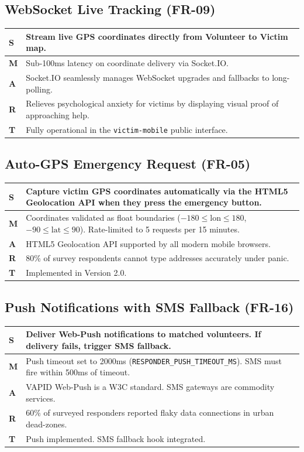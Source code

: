 \documentclass[12pt,a4paper]{article}
\begin{document}
\subsection{WebSocket Live Tracking (FR-09)}
\begin{tabularx}{\textwidth}{|l|X|}
\hline
\rowcolor{lightorange}
\textbf{S} & Stream live GPS coordinates directly from Volunteer to Victim map. \\
\hline
\textbf{M} & Sub-100ms latency on coordinate delivery via Socket.IO. \\
\hline
\textbf{A} & Socket.IO seamlessly manages WebSocket upgrades and fallbacks to long-polling. \\
\hline
\textbf{R} & Relieves psychological anxiety for victims by displaying visual proof of approaching help. \\
\hline
\textbf{T} & Fully operational in the \texttt{victim-mobile} public interface. \\
\hline
\end{tabularx}

\subsection{Auto-GPS Emergency Request (FR-05)}
\begin{tabularx}{\textwidth}{|l|X|}
\hline
\rowcolor{lightorange}
\textbf{S} & Capture victim GPS coordinates automatically via the HTML5 Geolocation API when they press the emergency button. \\
\hline
\textbf{M} & Coordinates validated as float boundaries ($-180 \leq \text{lon} \leq 180$, $-90 \leq \text{lat} \leq 90$). Rate-limited to 5 requests per 15 minutes. \\
\hline
\textbf{A} & HTML5 Geolocation API supported by all modern mobile browsers. \\
\hline
\textbf{R} & 80\% of survey respondents cannot type addresses accurately under panic. \\
\hline
\textbf{T} & Implemented in Version 2.0. \\
\hline
\end{tabularx}

\subsection{Push Notifications with SMS Fallback (FR-16)}
\begin{tabularx}{\textwidth}{|l|X|}
\hline
\rowcolor{lightorange}
\textbf{S} & Deliver Web-Push notifications to matched volunteers. If delivery fails, trigger SMS fallback. \\
\hline
\textbf{M} & Push timeout set to 2000ms (\texttt{RESPONDER\_PUSH\_TIMEOUT\_MS}). SMS must fire within 500ms of timeout. \\
\hline
\textbf{A} & VAPID Web-Push is a W3C standard. SMS gateways are commodity services. \\
\hline
\textbf{R} & 60\% of surveyed responders reported flaky data connections in urban dead-zones. \\
\hline
\textbf{T} & Push implemented. SMS fallback hook integrated. \\
\hline
\end{tabularx}
\end{document}
